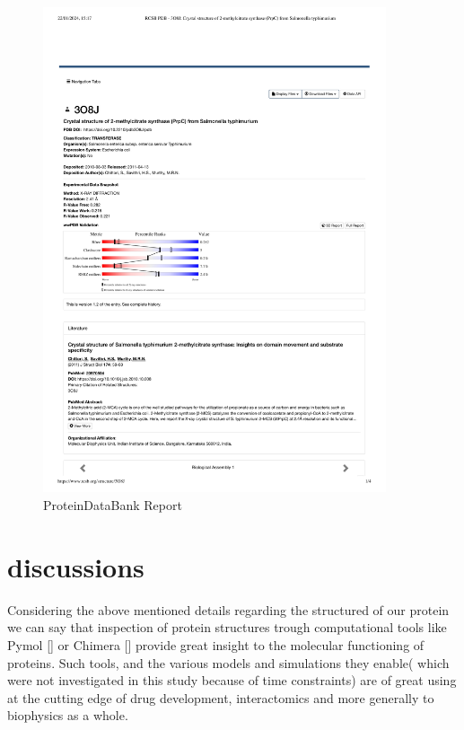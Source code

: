 \documentclass[a4paper,english,12pt,bibliography=totoc]{scrreprt}
\begin{document}
\begin{figure}[H]
        \centering
        \includegraphics[width=0.9\textwidth]{Project 3/PDBreport.pdf}
	    \caption{ProteinDataBank Report}
\end{figure}




\section{discussions}

Considering the above mentioned details regarding the structured of our protein we can say that inspection of protein structures trough computational tools like Pymol [\cite{schrodinger_llc_pymol_2015}] or Chimera [\cite{pettersen_ucsf_2004}] provide great insight to the molecular functioning of proteins.
Such tools, and the various models and simulations they enable( which were not investigated in this study because of time constraints) are of great using at the cutting edge of drug development, interactomics and more generally to biophysics as a whole.
\end{document}
